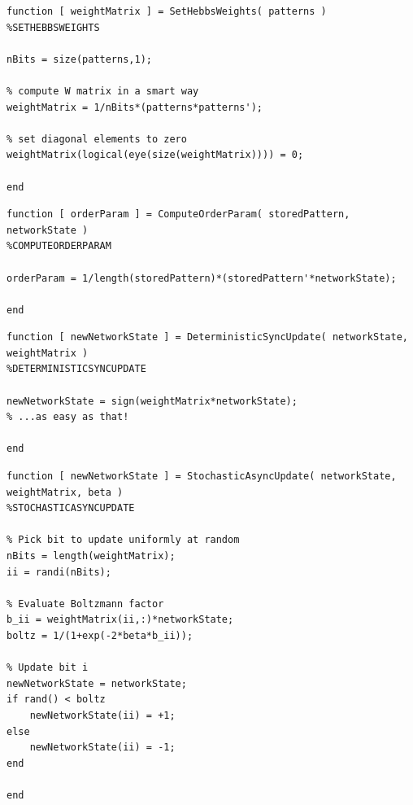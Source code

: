 \documentclass[12pt,A4,titlepage]{article}
\begin{document}
\bigskip

\bigskip
\begin{lstlisting}
function [ weightMatrix ] = SetHebbsWeights( patterns )
%SETHEBBSWEIGHTS

nBits = size(patterns,1);

% compute W matrix in a smart way
weightMatrix = 1/nBits*(patterns*patterns');

% set diagonal elements to zero
weightMatrix(logical(eye(size(weightMatrix)))) = 0;

end
\end{lstlisting}

\bigskip

\bigskip
\begin{lstlisting}
function [ orderParam ] = ComputeOrderParam( storedPattern, networkState )
%COMPUTEORDERPARAM

orderParam = 1/length(storedPattern)*(storedPattern'*networkState);

end
\end{lstlisting}

\bigskip

\bigskip
\begin{lstlisting}
function [ newNetworkState ] = DeterministicSyncUpdate( networkState, weightMatrix )
%DETERMINISTICSYNCUPDATE

newNetworkState = sign(weightMatrix*networkState);
% ...as easy as that!

end
\end{lstlisting}

\bigskip

\bigskip

\begin{lstlisting}
function [ newNetworkState ] = StochasticAsyncUpdate( networkState, weightMatrix, beta )
%STOCHASTICASYNCUPDATE

% Pick bit to update uniformly at random
nBits = length(weightMatrix);
ii = randi(nBits);

% Evaluate Boltzmann factor
b_ii = weightMatrix(ii,:)*networkState;
boltz = 1/(1+exp(-2*beta*b_ii));

% Update bit i
newNetworkState = networkState;
if rand() < boltz
    newNetworkState(ii) = +1;
else
    newNetworkState(ii) = -1;
end

end
\end{lstlisting}
\end{document}
